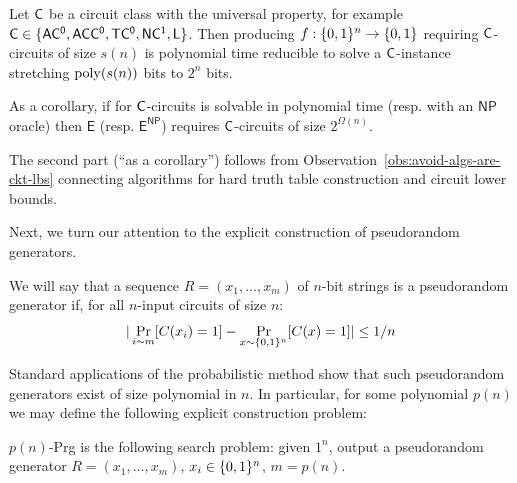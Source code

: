 \begin{theorem}\label{thm:strong-tt-to-avoid}
\sloppy Let $\cl{C}$ be a circuit class with the universal property, for example $\cl{C} \in \{\mathsf{AC^0},\mathsf{ACC^0}, \mathsf{TC^0}, \mathsf{NC^1}, \mathsf{L}\}$. Then producing $f: \{0,1\}^n \to \{0,1\}$ requiring $\cl{C}$-circuits of size $s(n)$ is polynomial time reducible to solve a $\cl{C}$-\avoid instance stretching $\mathrm{poly}(s(n))$ bits to $ {2^n}$ bits.

As a corollary, if \avoid for $\cl{C}$-circuits is solvable in polynomial time (resp. with an $\mathsf{NP}$ oracle) then $\mathsf{E}$ (resp. $\mathsf{E^{NP}}$) requires $\cl{C}$-circuits of size $2^{\Omega(n)}$.
\end{theorem}
The second part (``as a corollary'') follows from Observation~\ref{obs:avoid-algs-are-ckt-lbs} connecting algorithms for hard truth table construction and circuit lower bounds.


Next, we turn our attention to the explicit construction of pseudorandom generators.
\begin{definition}\label{range:def:prg-sequence}
We will say that a sequence $R = (x_1, \ldots, x_m)$ of $n$-bit strings is a pseudorandom generator if, for all $n$-input circuits of size $n$:
\[
|\Pr_{i \sim m}[C(x_i)=1] - \Pr_{x \sim \{0,1\}^n}[C(x)=1]| \leq 1/n
\]
\end{definition}

Standard applications of the probabilistic method show that such pseudorandom generators exist of size polynomial in $n$. In particular, for some polynomial $p(n)$ we may define the following explicit construction problem:
\begin{definition}\label{range:def:p-prg}
{\sc $p(n)$-Prg} is the following search problem: given $1^n$, output a pseudorandom generator $R = (x_1, \ldots, x_m)$, $x_i \in \{0,1\}^n$, $m = p(n)$.
\end{definition}

